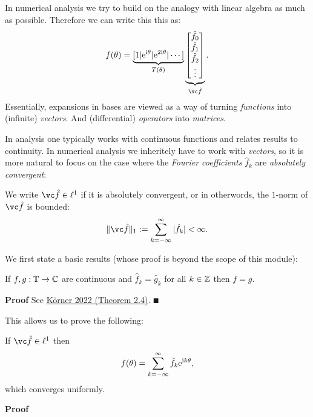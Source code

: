 In numerical analysis we try to build on the analogy with linear algebra as much as possible. Therefore we  can write this this as:
\[
f(\ensuremath{\theta}) = \underbrace{[1 | {\rm e}^{{\rm i}\ensuremath{\theta}} | {\rm e}^{2{\rm i}\ensuremath{\theta}} | \ensuremath{\cdots}]}_{T(\ensuremath{\theta})}
\underbrace{\begin{bmatrix} \hat f_0 \\ \hat f_1 \\ \hat f_2 \\ \ensuremath{\vdots} \end{bmatrix}}_{\vchatf}.
\]
Essentially, expansions in bases are viewed as a way of turning \emph{functions} into (infinite) \emph{vectors}. And (differential) \emph{operators} into \emph{matrices}.

In analysis one typically works with continuous functions and relates results to continuity. In numerical analysis we inheritely have to work with \emph{vectors}, so it is more natural to  focus on the case where the \emph{Fourier coefficients} $\hat f_k$ are \emph{absolutely convergent}:

\begin{definition} We write $\vchatf \ensuremath{\in} \ensuremath{\ell}^1$ if it is absolutely convergent, or in otherwords, the $1$-norm of $\vchatf$ is bounded:
\[
\|\vchatf\|_1 := \ensuremath{\sum}_{k=-\ensuremath{\infty}}^\ensuremath{\infty} |\hat f_k| < \ensuremath{\infty}.
\]
\end{definition}

We first state a  basic results (whose proof is beyond the scope of this module):

\begin{theorem} If $f, g : {\mathbb T} \rightarrow {\mathbb C}$ are continuous and $\hat f_k = \hat g_k$ for all $k \in {\mathbb Z}$ then $f = g$.

\end{theorem}
\textbf{Proof} See \href{https://www.cambridge.org/core/books/fourier-analysis/5FD8F0FD69DDB139019655D7F8440D2F}{Körner 2022 (Theorem 2.4)}. \ensuremath{\QED}

This allows us to prove the following:

\begin{theorem} If $\vchatf \ensuremath{\in} \ensuremath{\ell}^1$ then
\[
f(\ensuremath{\theta}) = \ensuremath{\sum}_{k = -\ensuremath{\infty}}^\ensuremath{\infty} \hat f_k {\rm e}^{{\rm i} k \ensuremath{\theta}},
\]
which converges uniformly. \end{theorem}
\textbf{Proof}

